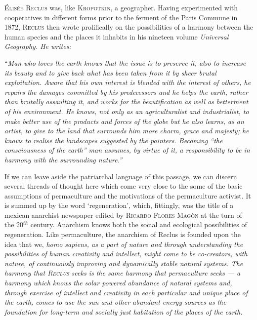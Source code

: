 \documentclass[a4paper, 11pt]{article}
\begin{document}
\begin{multicols*}{2}
\textsc{\'Elis\'ee Reclus} was, like \textsc{Kropotkin}, a geographer.  Having experimented with cooperatives in different forms prior to the ferment of the Paris Commune in 1872, \textsc{Reclus} then wrote prolifically on the possibilities of a harmony between the human species and the places it inhabits in his nineteen volume \em{Universal Geography}\em.  He writes:

\vspace{1mm}
``\em{Man who loves the earth knows that the issue is to preserve it, also to increase its beauty and to give back what has been taken from it by sheer brutal exploitation.  Aware that his own interest is blended with the interest of others, he repairs the damages committed by his predecessors and he helps the earth, rather than brutally assaulting it, and works for the beautification as well as betterment of his environment.  He knows, not only as an agriculturalist and industrialist, to make better use of the products and forces of the globe but he also learns, as an artist, to give to the land that surrounds him more charm, grace and majesty; he knows to realise \em{the landscapes suggested by the painters}\em.  Becoming ``the consciousness of the earth'' man assumes, by virtue of it, a responsibility to be in harmony with the surrounding nature.}\em''
\vspace{1mm}

If we can leave aside the patriarchal language of this passage, we can discern several threads of thought here which come very close to the some of the basic assumptions of permaculture and the motivations of the permaculture activist.  It is summed up by the word `regeneration', which, fittingly, was the title of a mexican anarchist newspaper edited by \textsc{Ricardo Flores Mag\`on} at the turn of the 20$^{th}$ century.  Anarchism knows both the social and ecological possibilities of regeneration. Like permaculture, the anarchism of Reclus is founded upon the idea that we, \em{homo sapiens}\em, as a part of nature and through understanding the possibilities of human creativity and intellect, might come to be co-creators, with nature, of continuously improving and dynamically stable natural systems.  The harmony that \textsc{Reclus} seeks is the same harmony that permaculture seeks --- a harmony which knows the solar powered abundance of natural systems and, through exercise of intellect and creativity in each particular and unique place of the earth, comes to use the sun and other abundant energy sources as the foundation for long-term and socially just habitation of the places of the earth.


\end{multicols*}
\end{document}
